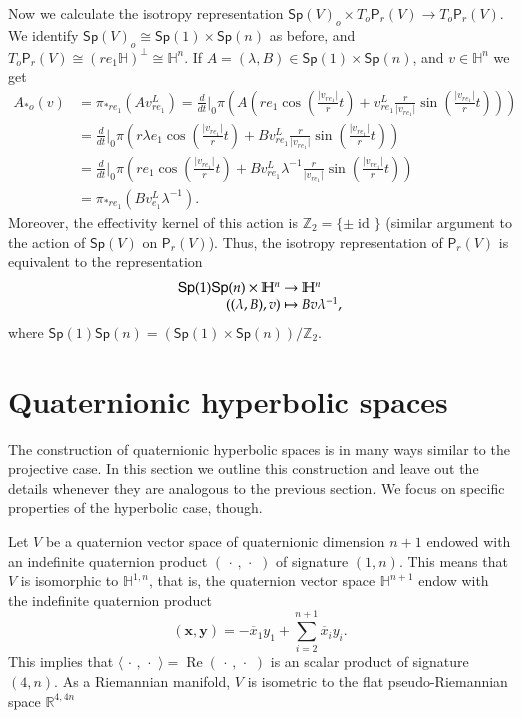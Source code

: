 \documentclass[12pt, a4paper]{amsart}
\newcommand{\id}{\operatorname{id}}
\newcommand{\R}{\mathbb{R}}
\renewcommand{\H}{\mathbb{H}}
\renewcommand{\Re}{\operatorname{Re}}
\newcommand{\Sp}{\mathsf{Sp}}
\theoremstyle{remark}
\begin{document}
Now we calculate the isotropy representation $\Sp(V)_o\times T_o\mathsf{P}_r(V)\to T_o\mathsf{P}_r(V)$.
We identify $\Sp(V)_o\cong \Sp(1)\times\Sp(n)$ as before, and $T_o\mathsf{P}_r(V)\cong(re_1\H)^\perp\cong\H^{n}$.
If $A=(\lambda,B)\in\Sp(1)\times\Sp(n)$, and $v\in\H^n$ we get
\[
\begin{aligned}
A_{*o}(v)
&{}=\pi_{*re_1}(Av_{re_1}^L)
=\frac{d}{dt}\Big\vert_0 \pi\left(A
\left(re_1\cos\left(\frac{\lvert v_{re_1}\rvert}{r}t\right)+v_{re_1}^L\frac{r}{\lvert v_{re_1}\rvert}\sin\left(\frac{\lvert v_{re_1}\rvert}{r}t\right)\right)\right)\\
&{}=\frac{d}{dt}\Big\vert_0 \pi\left(r\lambda e_1\cos\left(\frac{\lvert v_{re_1}\rvert}{r}t\right)+Bv_{re_1}^L\frac{r}{\lvert v_{re_1}\rvert}\sin\left(\frac{\lvert v_{re_1}\rvert}{r}t\right)\right)\\
&{}=\frac{d}{dt}\Big\vert_0 \pi\left(r e_1\cos\left(\frac{\lvert v_{re_1}\rvert}{r}t\right)+Bv_{re_1}^L\lambda^{-1}\frac{r}{\lvert v_{re_1}\rvert}\sin\left(\frac{\lvert v_{re_1}\rvert}{r}t\right)\right)\\[1ex]
&{}=\pi_{*re_1}(Bv_{e_1}^L\lambda^{-1}).
\end{aligned}
\]
Moreover, the effectivity kernel of this action is $\mathbb{Z}_2=\{\pm\id\}$ (similar argument to the action of $\Sp(V)$ on $\mathsf{P}_r(V)$).
Thus, the isotropy representation of $\mathsf{P}_r(V)$ is equivalent to the representation
\[
\begin{array}{r@{\ }c@{\ }l}
\Sp(1)\Sp(n)\times\H^n & \to & \H^n\\
((\lambda,B),v) & \mapsto & Bv\lambda^{-1},
\end{array}
\]
where $\Sp(1)\Sp(n)=(\Sp(1)\times\Sp(n))/\mathbb{Z}_2$.


\section{Quaternionic hyperbolic spaces}

The construction of quaternionic hyperbolic spaces is in many ways similar to the projective case.
In this section we outline this construction and leave out the details whenever they are analogous to the previous section.
We focus on specific properties of the hyperbolic case, though.

Let $V$ be a quaternion vector space of quaternionic dimension $n+1$ endowed with an indefinite quaternion product $(\,\cdot\,,\,\cdot\,\,)$ of signature $(1,n)$.
This means that $V$ is isomorphic to $\H^{1,n}$, that is, the quaternion vector space $\H^{n+1}$ endow with the indefinite quaternion product 
\[
(\mathbf{x},\mathbf{y})
=-\overline{x}_1{y}_1+\sum_{i=2}^{n+1}\overline{x}_i {y}_i.
\]
This implies that $\langle\,\cdot\,,\,\cdot\,\,\rangle=\Re(\,\cdot\,,\,\cdot\,\,)$ is an scalar product of signature $(4,n)$.
As a Riemannian manifold, $V$ is isometric to the flat pseudo-Riemannian space $\R^{4,4n}$
\end{document}
